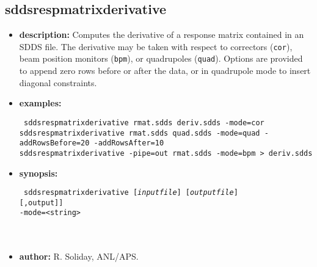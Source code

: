 %
\newpage
\subsection{sddsrespmatrixderivative}
\label{sddsrespmatrixderivative}

\begin{itemize}
\item {\bf description:} Computes the derivative of a response matrix contained in an SDDS file.  The derivative may be taken with respect to correctors ({\tt cor}), beam position monitors ({\tt bpm}), or quadrupoles ({\tt quad}).  Options are provided to append zero rows before or after the data, or in quadrupole mode to insert diagonal constraints.
\item {\bf examples:}
\begin{flushleft}{\tt
sddsrespmatrixderivative rmat.sdds deriv.sdds -mode=cor\\
sddsrespmatrixderivative rmat.sdds quad.sdds -mode=quad -addRowsBefore=20 -addRowsAfter=10\\
sddsrespmatrixderivative -pipe=out rmat.sdds -mode=bpm > deriv.sdds
}\end{flushleft}
\item {\bf synopsis:}
\begin{flushleft}{\tt
sddsrespmatrixderivative [{\em inputfile}] [{\em outputfile}]\\
                       [-pipe=[input][,output]]\\
                        -mode={<string>}\\
                       [-addRowsBefore={<number>}]\\
                       [-addRowsAfter={<number>}]\\
                       [-verbose]
}\end{flushleft}
\item {\bf author:} R. Soliday, ANL/APS.
\end{itemize}
